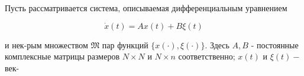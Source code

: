 \documentclass[10pt]{article}
\begin{document}
Пусть рассматривается система, описываемая дифференциальным уравнением



\[

\dot{x}(t)=A x(t)+B \xi(t)

\]



и нек-рым множеством $\mathfrak{M}$ пар функций $\{x(\cdot), \xi(\cdot)\}$. Здесь $A, B$ - постоянные комплексные матрицы размеров $N \times N$ и $N \times n$ соответственно; $x(t)$ и $\xi(t)-$ век-
\end{document}
